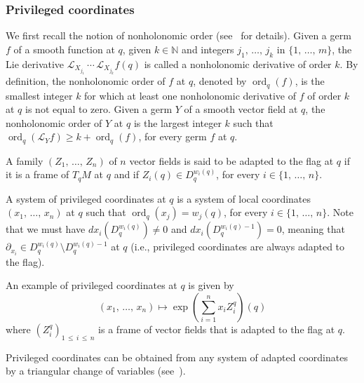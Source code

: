 \documentclass[10pt]{amsart}
\theoremstyle{definition}\newtheorem{defi}[theo]{Definition}\newtheorem{rema}[theo]{Remark}\newtheorem{exam}[theo]{Example}\newtheorem{exem}[theo]{Example}\newtheorem{nota}[theo]{Notation}
\newcommand*\N{\mathbb{N}}
\newcommand{\calL}{\mathcal{L}}
\DeclareMathOperator{\ord}{ord}
\renewcommand{\geq}{\geqslant}
\renewcommand{\leq}{\leqslant}
\begin{document}
\subsubsection{Privileged coordinates}
We first recall the notion of nonholonomic order (see~\cite{Bellaiche,Jean_2014,Mo-02} for details). Given a germ $f$ of a smooth function at $q$, given $k\in\N$ and integers $j_1,\,\ldots,\,j_k$ in $\{1,\,\ldots,\,m\}$, the Lie derivative $\calL_{X_{j_1}}\,\cdots\,\calL_{X_{j_k}}f(q)$ is called a nonholonomic derivative of order $k$. By definition, the nonholonomic order of $f$ at $q$, denoted by $\ord_{q}(f)$, is the smallest integer $k$ for which at least one nonholonomic derivative of $f$ of order $k$ at $q$ is not equal to zero. Given a germ $Y$ of a smooth vector field at $q$, the nonholonomic order of $Y$ at $q$ is the largest integer $k$ such that $\ord_{q}(\calL_Yf)\geq k+\ord_{q}(f)$, for every germ $f$ at $q$.

A family $(Z_1,\,\ldots,\,Z_n)$ of $n$ vector fields is said to be adapted to the flag at $q$ if it is a frame of $T_{q}M$ at $q$ and if $Z_i(q)\in D_{q}^{w_i(q)}$, for every $i\in\{1,\,\ldots,\,n\}$.

A system of privileged coordinates at $q$ is a system of local coordinates $(x_1,\,\ldots,\,x_n)$ at $q$ such that $\ord_{q}(x_j)=w_j(q)$, for every $i\in\{1,\,\ldots,\,n\}$. Note that we must have $dx_i(D_{q}^{w_i(q)})\neq 0$ and $dx_i(D_{q}^{w_i(q)-1})= 0$, meaning that $\partial_{x_i}\in D_{q}^{w_i(q)}\setminus D_{q}^{w_i(q)-1}$ at $q$ (i.e., privileged coordinates are always adapted to the flag).

An example of privileged coordinates at $q$ is given by
\begin{equation}\label{example_privileged}
(x_1,\,\ldots,\,x_n)\mapsto\exp \left(\sum_{i=1}^nx_i Z^q_i \right) (q)
\end{equation}
where $(Z^q_i)_{1\,\leq\,i\,\leq\,n}$ is a frame of vector fields that is adapted to the flag at $q$.

Privileged coordinates can be obtained from any system of adapted coordinates by a triangular change of variables (see~\cite{Jean_2014}).
\end{document}
